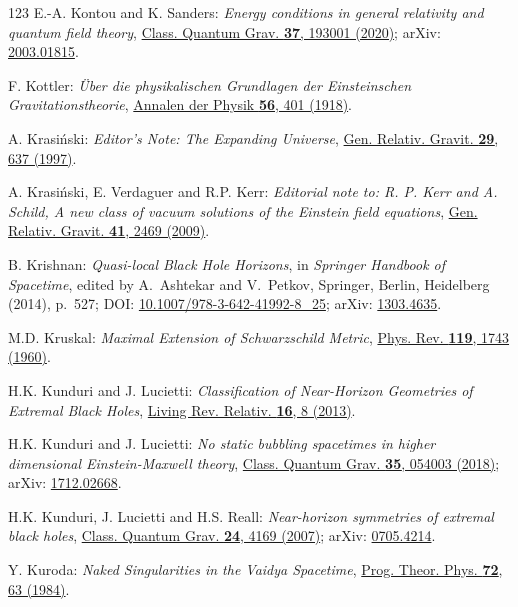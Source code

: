 \begin{thebibliography}{123}
E.-A. Kontou and K. Sanders:
{\em Energy conditions in general relativity and quantum field theory},
\href{https://doi.org/10.1088/1361-6382/ab8fcf}{Class. Quantum Grav. {\bf 37}, 193001 (2020)};
arXiv: \href{https://arxiv.org/abs/2003.01815}{2003.01815}.

F.  Kottler:
{\em \"Uber die physikalischen Grundlagen der Einsteinschen Gravitationstheorie},
\href{https://doi.org/10.1002/andp.19183611402}{Annalen der Physik {\bf 56}, 401 (1918)}.

A. Krasi\'nski:
{\em Editor's Note: The Expanding Universe},
\href{https://doi.org/10.1023/A:1018803604510}{Gen. Relativ. Gravit. {\bf 29}, 637 (1997)}.

A. Krasi\'nski, E. Verdaguer and R.P. Kerr:
{\em Editorial note to: R. P. Kerr and A. Schild, A new class of vacuum solutions of the Einstein field equations},
\href{https://doi.org/10.1007/s10714-009-0856-0}{Gen. Relativ. Gravit. {\bf 41}, 2469 (2009)}.

B. Krishnan:
{\em Quasi-local Black Hole Horizons},
in {\em Springer Handbook of Spacetime}, edited by A.~Ashtekar and V.~Petkov,
Springer, Berlin, Heidelberg (2014), p.~527;
DOI: \href{https://doi.org/10.1007/978-3-642-41992-8_25}{10.1007/978-3-642-41992-8\_25};
arXiv: \href{https://arxiv.org/abs/1303.4635}{1303.4635}.

M.D. Kruskal:
{\em Maximal Extension of Schwarzschild Metric},
\href{https://doi.org/10.1103/PhysRev.119.1743}{Phys. Rev. {\bf 119}, 1743 (1960)}.

H.K. Kunduri and J. Lucietti:
{\em Classification of Near-Horizon Geometries of Extremal Black Holes},
\href{https://doi.org/10.12942/lrr-2013-8}{Living Rev. Relativ. {\bf 16}, 8 (2013)}.

H.K. Kunduri and J. Lucietti:
{\em No static bubbling spacetimes in higher dimensional Einstein-Maxwell theory},
\href{https://doi.org/10.1088/1361-6382/aaa744}{Class. Quantum Grav. {\bf 35}, 054003 (2018)};
arXiv: \href{https://arxiv.org/abs/1712.02668}{1712.02668}.

H.K. Kunduri, J. Lucietti and H.S. Reall:
{\em Near-horizon symmetries of extremal black holes},
\href{https://doi.org/10.1088/0264-9381/24/16/012}{Class. Quantum Grav. {\bf 24}, 4169 (2007)};
arXiv: \href{https://arxiv.org/abs/0705.4214}{0705.4214}.

Y. Kuroda:
{\em Naked Singularities in the Vaidya Spacetime},
\href{https://doi.org/10.1143/PTP.72.63}{Prog. Theor. Phys. {\bf 72}, 63 (1984)}.


\end{thebibliography}
